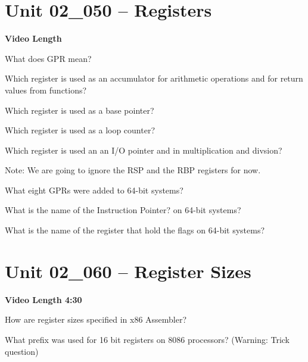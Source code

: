 \documentclass[letterpaper,12pt]{exam}
\newcommand{\unit}{Unit 02}
\begin{document}
\begin{questions}
\section*{\unit\_050 -- Registers}
\par{\selectfont\textbf{Video Length }}
\begin{samepage}
    \question  What does GPR mean? 
    \vspace{5mm}
\end{samepage}
\begin{samepage}
    \question Which register is used as an accumulator for arithmetic operations and for return values from functions?
    \vspace{5mm}
\end{samepage}
\begin{samepage}
    \question Which register is used as a base pointer?
    \vspace{5mm}
\end{samepage}
\begin{samepage}
    \question Which register is used as a loop counter?
    \vspace{5mm}
\end{samepage}
\begin{samepage}
    \question Which register is used an an I/O pointer and in multiplication and divsion?
    \vspace{5mm}
\end{samepage}
\par
Note: We are going to ignore the RSP and the RBP registers for now.
\par
\begin{samepage}
    \question What eight GPRs were added to 64-bit systems?
    \vspace{5mm}
\end{samepage}
\par
\begin{samepage}
    \question What is the name of the Instruction Pointer? on 64-bit systems?
    \vspace{5mm}
\end{samepage}
\par
\begin{samepage}
    \question What is the name of the register that hold the flags on 64-bit systems?
    \vspace{5mm}
\end{samepage}
\par
\section*{\unit\_060 -- Register Sizes }
\par{\selectfont\textbf{Video Length 4:30}}
\begin{samepage}
    \question How are register sizes specified in x86 Assembler?
    \vspace{5mm}
\end{samepage}
\begin{samepage}
    \question What prefix was used for 16 bit registers on 8086 processors? (Warning: Trick question)
    \vspace{5mm}
\end{samepage}


\end{questions}
\end{document}
